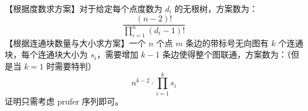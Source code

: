 【根据度数求方案】对于给定每个点度数为 $d_i$ 的无根树，方案数为：
$$
\dfrac{(n-2)!}{\prod_{i=1}^{n}(d_i-1)!}
$$
【根据连通块数量与大小求方案】一个 $n$ 个点 $m$ 条边的带标号无向图有 $k$ 个连通块，每个连通块大小为 $s_i$，需要增加 $k-1$ 条边使得整个图联通，方案数为：（但是当 $k=1$ 时需要特判）
$$
n^{k-2}\cdot\prod_{i=1}^{k}s_i
$$
证明只需考虑 prufer 序列即可。